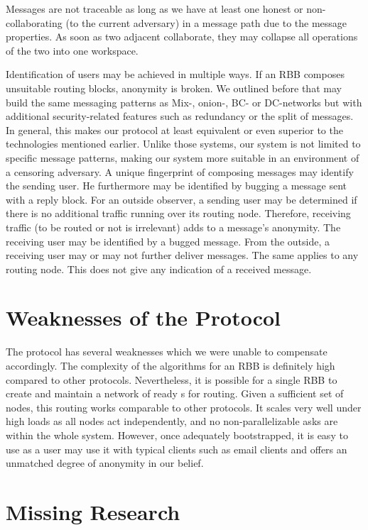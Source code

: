 Messages are not traceable as long as we have at least one honest or non-collaborating (to the current adversary) \VortexNode{} in a message path due to the message properties. As soon as two adjacent \VortexNodes{} collaborate, they may collapse all operations of the two into one workspace.

Identification of \MessageVortex{} users may be achieved in multiple ways. If an RBB composes unsuitable routing blocks, anonymity is broken. We outlined before that \MessageVortex{} may build the same messaging patterns as Mix-, onion-, BC- or DC-networks but with additional security-related features such as redundancy or the split of messages. In general, this makes our protocol at least equivalent or even superior to the technologies mentioned earlier. Unlike those systems, our system is not limited to specific message patterns, making our system more suitable in an environment of a censoring adversary. A unique fingerprint of composing messages may identify the sending user. He furthermore may be identified by bugging a message sent with a reply block. For an outside observer, a sending user may be determined if there is no additional traffic running over its routing node. Therefore, receiving traffic (to be routed or not is irrelevant) adds to a message's anonymity. The receiving user may be identified by a bugged message. From the outside, a receiving user may or may not further deliver messages. The same applies to any routing node. This does not give any indication of a received message.

\chapter{Weaknesses of the Protocol}
The protocol has several weaknesses which we were unable to compensate accordingly. The complexity of the algorithms for an RBB is definitely high compared to other protocols. Nevertheless, it is possible for a single RBB to create and maintain a network of ready s for routing. Given a sufficient set of nodes, this routing works comparable to other protocols. It scales very well under high loads as all nodes act independently, and no non-parallelizable asks are within the whole system. However, once adequately bootstrapped, it is easy to use as a user may use it with typical clients such as email clients and offers an unmatched degree of anonymity in our belief.

\chapter{Missing Research}
